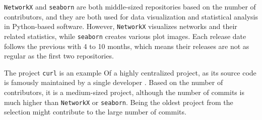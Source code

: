 \texttt{NetworkX} and \texttt{seaborn} are both middle-sized repositories based on the number of contributors, and they are both used for data visualization and statistical analysis in Python-based software. However, \texttt{NetworkX} visualizes networks and their related statistics, while \texttt{seaborn} creates various plot images. Each release date follows the previous with 4 to 10 months, which means their releases are not as regular as the first two repositories.

The project \texttt{curl} is an example Of a highly centralized project, as its source code is famously maintained by a single developer \cite{crowstonHierarchyCentralizationFree2006}. Based on the number of contributors, it is a medium-sized project, although the number of commits is much higher than \texttt{NetworkX} or \texttt{seaborn}. Being the oldest project from the selection might contribute to the large number of commits.

\begin{table}[!htbp]
    \centering
        \caption{Collaboration analysis projects and basic statistics.}
        \label{tab:projects}
\end{table}

